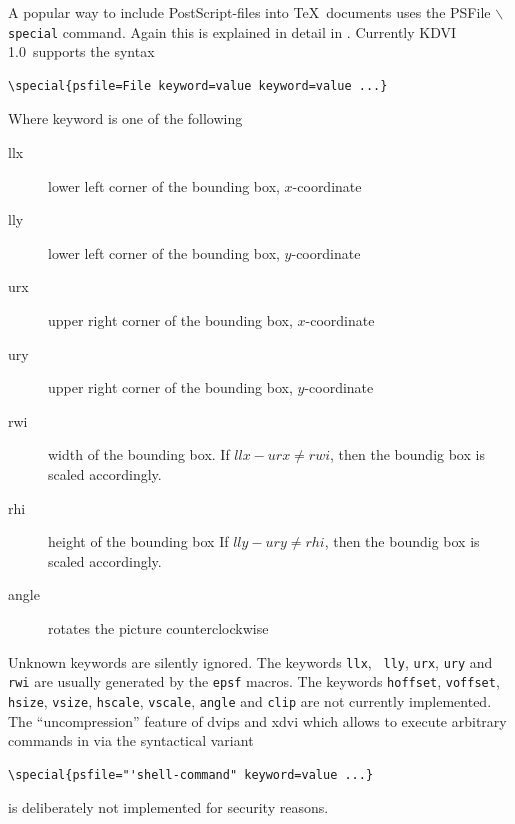 \documentclass{article}
\newcommand{\KDVI}{{\sf KDVI 1.0}}
\begin{document}
A popular way to include PostScript-files into \TeX\ documents uses
the PSFile $\backslash${\tt special} command. Again this is explained
in detail in \cite{dvips}. Currently \KDVI\ supports the syntax
\begin{verbatim}
\special{psfile=File keyword=value keyword=value ...}
\end{verbatim}
Where keyword is one of the following
\begin{description}
\item[llx] lower left corner of the bounding box, $x$-coordinate
\item[lly] lower left corner of the bounding box, $y$-coordinate
\item[urx] upper right corner of the bounding box, $x$-coordinate
\item[ury] upper right corner of the bounding box, $y$-coordinate
\item[rwi] width of the bounding box. If $llx-urx \not = rwi$, then
the boundig box is scaled accordingly. 
\item[rhi] height of the bounding box If $lly-ury \not = rhi$, then
the boundig box is scaled accordingly.
\item[angle] rotates the picture counterclockwise
\end{description}
Unknown keywords are silently ignored. The keywords {\tt llx}, {\tt
  lly}, {\tt urx}, {\tt ury} and {\tt rwi} are usually generated by
the {\tt epsf} macros.  The keywords {\tt hoffset}, {\tt voffset},
{\tt hsize}, {\tt vsize}, {\tt hscale}, {\tt vscale}, {\tt angle} and
{\tt clip} are not currently implemented. The ``uncompression''
feature of {\sf dvips} and {\sf xdvi} which allows to execute
arbitrary commands in via the syntactical variant
\begin{verbatim}
\special{psfile="'shell-command" keyword=value ...}
\end{verbatim}
is deliberately not implemented for security reasons.
\end{document}
